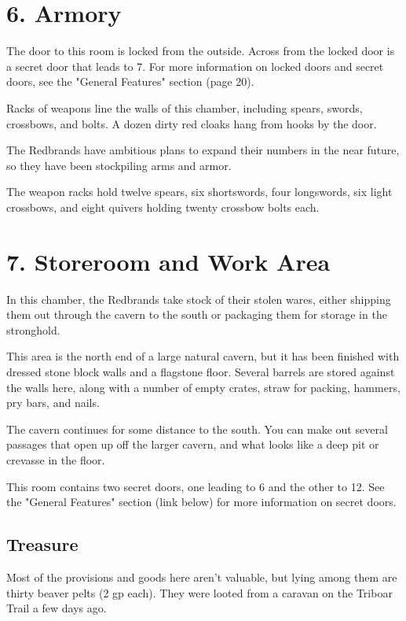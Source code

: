 \documentclass[10pt,a4paper,twoside,bg=print,twocolumn,openany,nodeprecatedcode]{dndbook}
\begin{document}
\section{6. Armory}
The door to this room is locked from the outside. Across from the locked door is a secret door that leads to 7. For more information on locked doors and secret doors, see the "General Features" section (page 20).

\begin{DndReadAloud}{}
Racks of weapons line the walls of this chamber, including spears, swords, crossbows, and bolts. A dozen dirty red cloaks hang from hooks by the door.

\end{DndReadAloud}

The Redbrands have ambitious plans to expand their numbers in the near future, so they have been stockpiling arms and armor.

The weapon racks hold twelve spears, six shortswords, four longswords, six light crossbows, and eight quivers holding twenty crossbow bolts each.

\section{7. Storeroom and Work Area}
In this chamber, the Redbrands take stock of their stolen wares, either shipping them out through the cavern to the south or packaging them for storage in the stronghold.

\begin{DndReadAloud}{}
This area is the north end of a large natural cavern, but it has been finished with dressed stone block walls and a flagstone floor. Several barrels are stored against the walls here, along with a number of empty crates, straw for packing, hammers, pry bars, and nails.

The cavern continues for some distance to the south. You can make out several passages that open up off the larger cavern, and what looks like a deep pit or crevasse in the floor.

\end{DndReadAloud}

This room contains two secret doors, one leading to 6 and the other to 12. See the "General Features" section (link below) for more information on secret doors.

\subsection{Treasure}
Most of the provisions and goods here aren't valuable, but lying among them are thirty beaver pelts (2 gp each). They were looted from a caravan on the Triboar Trail a few days ago.
\end{document}
